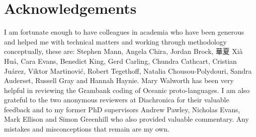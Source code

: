 \documentclass[12pt,letterpaper]{article}
\begin{document}







\FloatBarrier


\section*{Acknowledgements}
I am fortunate enough to have colleagues in academia who have been generous and helped me with technical matters and working through methodology conceptually, these are: Stephen Mann, Angela Chira, Jordan Brock, 華夏 Xià Huá, Cara Evans, Benedict King, Gerd Carling, Chundra Cathcart, Cristian Juárez, Viktor Martinović, Robert Tegethoff, Natalia Chousou-Polydouri, Sandra Auderset, Russell Gray and Hannah Haynie. Mary Walworth has been very helpful in reviewing the Grambank coding of Oceanic proto-languages. I am also grateful to the two anonymous reviewers at Diachronica for their valuable feedback and to my former PhD supervisors Andrew Pawley, Nicholas Evans, Mark Ellison and Simon Greenhill who also provided valuable commentary. Any mistakes and misconceptions that remain are my own.
\end{document}
